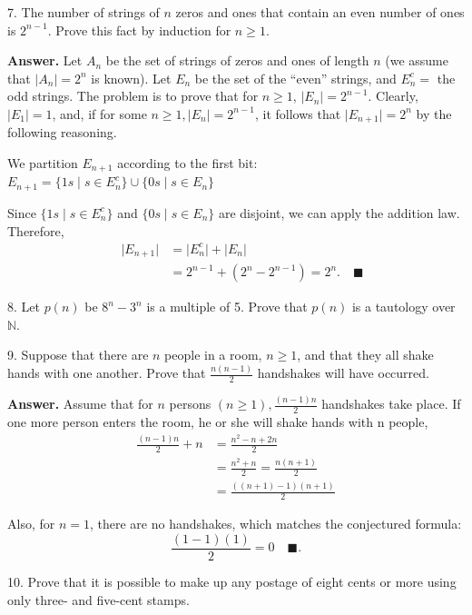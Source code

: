 \documentclass[10pt,]{book}
\theoremstyle{plain}
\theoremstyle{definition}
\theoremstyle{definition}
\theoremstyle{definition}
\theoremstyle{definition}
\begin{document}
\begin{exercisegroup}
\item[7.]\hypertarget{exercise-44}{}The number of strings of \(n\) zeros and ones that contain an even number of ones is \(2^{n-1}\).   Prove this fact by induction for \(n \geq  1\).%
\par\smallskip
\par\smallskip
\noindent\textbf{Answer.}\hypertarget{answer-21}{}\quad
 Let \(A_n\) be the set of strings of zeros and ones of length \(n\) (we assume that \(\lvert A_n \rvert =2^n\) is known). Let  \(E_n\) be the set of the ``even'' strings, and \(E_{n}^{c}=\) the odd strings. The problem is to prove that for \(n\geqslant 1\), \(\lvert E_n \rvert =2^{n-1}\). Clearly, \(\lvert E_1\rvert =1\), and, if for some \(n\geqslant 1, \lvert E_n\rvert =2^{n-1}\), it follows that \(\lvert E_{n+1}\rvert  =2^n\) by the following reasoning.%
\par
We partition \(E_{n+1}\) according to the first bit: \(	E_{n+1}=\{1s\mid s \in E_n^c \}\cup \{ 0s \mid s \in E_n\}\)%
\par
 Since \(\{1s\mid s \in E_n^c\}\) and \(\{0s \mid s \in E_n\}\) are disjoint, we can apply the addition law. Therefore, 
\begin{equation*}
\begin{split}
\quad \lvert  E_{n+1}\rvert & =\lvert E_n^c \rvert  +\lvert  E_n \rvert  \\
	& =2^{n-1}+ (2^n-2^{n-1}) =2^n.\quad \blacksquare
\end{split}
\end{equation*}
%
\item[8.]\hypertarget{exercise-45}{} Let \(p(n)\) be \(8^n-3^n\) is a multiple of 5.  Prove that \(p(n)\) is a tautology over \(\mathbb{N}\).%
\par\smallskip
\item[9.]\hypertarget{exercise-46}{}Suppose that there are \(n\) people in a room, \(n \geq  1\), and that they all shake hands with one another. Prove that \(\frac{n(n-1)}{2}\)
handshakes will have occurred.
%
\par\smallskip
\par\smallskip
\noindent\textbf{Answer.}\hypertarget{answer-22}{}\quad
 Assume that for \(n\) persons \((n\geqslant 1),\frac{(n-1)n}{2}\) handshakes take place. If one more person enters the room, he or she will shake hands with n people,
\begin{equation*}
\begin{split}
\frac{(n-1)n}{2}+n & =\frac{n^2-n+2n}{2}\\
	&=\frac{n^2+n}{2}=\frac{n(n+1)}{2}\\
	&=\frac{((n+1)-1)(n+1)}{2}
\end{split}
\end{equation*}

Also, for \(n=1\), there are no handshakes, which matches the conjectured formula: \[\frac{(1-1)(1)}{2}=0 \quad \blacksquare.\] %
\item[10.]\hypertarget{exercise-47}{}Prove that it is possible to make up any postage of eight cents or more using only three- and five-cent stamps.
%
\par\smallskip
\end{exercisegroup}
\end{document}
